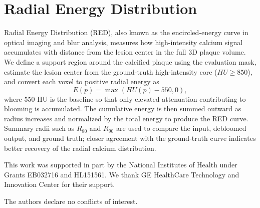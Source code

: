 \documentclass[singleLetter,times]{sagej}
\begin{document}
\section{Radial Energy Distribution}
\label{supp:evaluation_metrics}
Radial Energy Distribution (RED), also known as the encircled-energy curve in optical imaging and blur analysis, measures how high-intensity calcium signal accumulates with distance from the lesion center in the full 3D plaque volume. We define a support region around the calcified plaque using the evaluation mask, estimate the lesion center from the ground-truth high-intensity core ($HU \ge 850$), and convert each voxel to positive radial energy as
\[
E(p)=\max(HU(p)-550,0),
\]
where 550 HU is the baseline so that only elevated attenuation contributing to blooming is accumulated. The cumulative energy is then summed outward as radius increases and normalized by the total energy to produce the RED curve. Summary radii such as $R_{80}$ and $R_{90}$ are used to compare the input, debloomed output, and ground truth; closer agreement with the ground-truth curve indicates better recovery of the radial calcium distribution.

\ifdefined\blinded
\else
\begin{acks}
This work was supported in part by the National Institutes of Health under Grants EB032716 and HL151561. We thank GE HealthCare Technology and Innovation Center for their support.
\end{acks}
\fi

\begin{dci}
The authors declare no conflicts of interest.
\end{dci}



\end{document}
